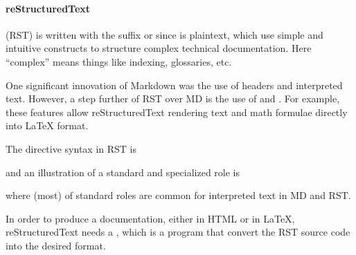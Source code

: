 \documentclass[a4paper,12pt,english]{sphinxhowto}
\begin{document}


\paragraph{reStructuredText}
\label{\detokenize{DDHH:restructuredtext}}
 (RST) is written with the suffix  or  since is plaintext, which use simple and intuitive
constructs to structure complex technical documentation. Here “complex” means things like indexing, glossaries, etc.

One significant innovation of Markdown was the use of headers and interpreted text. However, a step further
of RST over MD is the use of  and . For example, these features allow reStructuredText
rendering text and math formulae directly into LaTeX format.

The directive syntax in RST is
\begin{quote}

\begin{sphinxVerbatim}[commandchars=\\\{\},formatcom=\footnotesize]
   
\end{sphinxVerbatim}
\end{quote}

and an illustration of a standard and specialized role is
\begin{quote}

\begin{sphinxVerbatim}[commandchars=\\\{\},formatcom=\footnotesize]
   
   
\end{sphinxVerbatim}
\end{quote}

where (most) of standard roles are common for interpreted text in MD and RST.

In order to produce a documentation, either in HTML or in LaTeX, reStructuredText needs a , which is
a program that convert the RST source code into the desired format.
\end{document}
